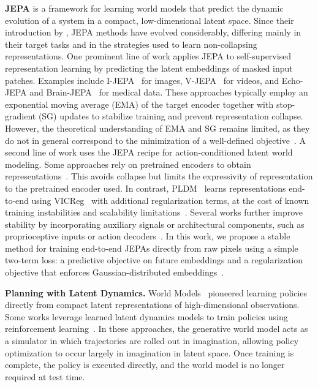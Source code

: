 \noindent \textbf{JEPA} is a framework for learning world models that predict the dynamic evolution of a system in a compact, low-dimensional latent space. Since their introduction by \citet{lecun2022path}, JEPA methods have evolved considerably, differing mainly in their target tasks and in the strategies used to learn non-collapsing representations. One prominent line of work applies JEPA to self-supervised representation learning by predicting the latent embeddings of masked input patches. Examples include I-JEPA~\cite{assran2023self} for images, V-JEPA~\cite{bardes2023v, assran2025v} for videos, and Echo-JEPA and Brain-JEPA~\cite{dong2024brainjepa, munim2026echojepalatentpredictivefoundation} for medical data. These approaches typically employ an exponential moving average (EMA) of the target encoder together with stop-gradient (SG) updates to stabilize training and prevent representation collapse. However, the theoretical understanding of EMA and SG remains limited, as they do not in general correspond to the minimization of a well-defined objective~\cite{ponce2026dual}. A second line of work uses the JEPA recipe for action-conditioned latent world modeling. Some approaches rely on pretrained encoders to obtain representations~\cite{assran2025v, zhou2025dino-wm, goswami2025osviwmoneshotvisualimitation,nam2026causaljepalearningworldmodels}. This avoids collapse but limits the expressivity of representation to the pretrained encoder used. In contrast, PLDM~\cite{sobal2022jointembeddingpredictivearchitectures,sobal2025stresstesting} learns representations end-to-end using VICReg~\cite{bardes2022vicreg} with additional regularization terms, at the cost of known training instabilities and scalability limitations~\citep{balestriero2022contrastive}. Several works further improve stability by incorporating auxiliary signals or architectural components, such as proprioceptive inputs or action decoders~\cite{zhou2025dino-wm, goswami2025osviwmoneshotvisualimitation}. In this work, we propose a stable method for training end-to-end JEPAs directly from raw pixels using a simple two-term loss: a predictive objective on future embeddings and a regularization objective that enforces Gaussian-distributed embeddings~\citep{balestriero2025lejepa}.

\noindent \textbf{Planning with Latent Dynamics.}
World Models~\cite{ha2018recurrent} pioneered learning policies directly from compact latent representations of high-dimensional observations. Some works leverage learned latent dynamics models to train policies using reinforcement learning~\cite{Hafner2020Dream,hafner2020dreamerv2,hafner2023dreamerv3,hafner2025dreamerv4}. In these approaches, the generative world model acts as a simulator in which trajectories are rolled out in imagination, allowing policy optimization to occur largely in imagination in latent space. Once training is complete, the policy is executed directly, and the world model is no longer required at test time.

